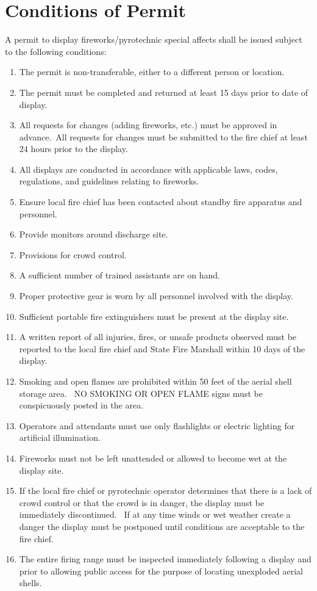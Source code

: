 \section{Conditions of Permit}
A permit to display fireworks/pyrotechnic special affects shall be issued subject to the following conditions:
\begin{enumerate}[{\indent}A)]
    \item The permit is non-transferable, either to a different person or location. 
    \item The permit must be completed and returned at least 15 days prior to date of display. 
    \item All requests for changes (adding fireworks, etc.) must be approved in advance. All requests for changes must be submitted to the fire chief at least 24 hours prior to the display. 
    \item All displays are conducted in accordance with applicable laws, codes, regulations, and guidelines relating to fireworks. 
    \item Ensure local fire chief has been contacted about standby fire apparatus and personnel.
    \item Provide monitors around discharge site. 
    \item Provisions for crowd control. 
    \item A sufficient number of trained assistants are on hand. 
    \item Proper protective gear is worn by all personnel involved with the display. 
    \item Sufficient portable fire extinguishers must be present at the display site. 
    \item A written report of all injuries, fires, or unsafe products observed must be reported to the local fire chief and State Fire Marshall within 10 days of the display. 
    \item Smoking and open flames are prohibited within 50 feet of the aerial shell storage area.  NO SMOKING OR OPEN FLAME signs must be conspicuously posted in the area.
    \item Operators and attendants must use only flashlights or electric lighting for artificial illumination.  
    \item Fireworks must not be left unattended or allowed to become wet at the display site. 
    \item If the local fire chief or pyrotechnic operator determines that there is a lack of crowd control or that the crowd is in danger, the display must be immediately discontinued.  If at any time winds or wet weather create a danger the display must be postponed until conditions are acceptable to the fire chief. 
    \item The entire firing range must be inspected immediately following a display and prior to allowing public access for the purpose of locating unexploded aerial shells. 
\end{enumerate}
